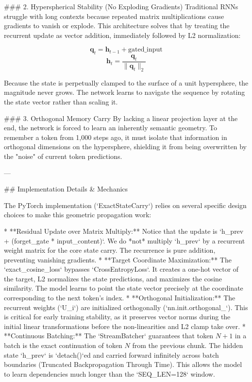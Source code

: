 ### 2. Hyperspherical Stability (No Exploding Gradients)
Traditional RNNs struggle with long contexts because repeated matrix multiplications cause gradients to vanish or explode. This architecture solves that by treating the recurrent update as vector addition, immediately followed by L2 normalization:

$$ \mathbf{q}_t = \mathbf{h}_{t-1} + \text{gated\_input} $$
$$ \mathbf{h}_t = \frac{\mathbf{q}_t}{\|\mathbf{q}_t\|_2} $$

Because the state is perpetually clamped to the surface of a unit hypersphere, the magnitude never grows. The network learns to navigate the sequence by rotating the state vector rather than scaling it.

### 3. Orthogonal Memory Carry
By lacking a linear projection layer at the end, the network is forced to learn an inherently semantic geometry. To remember a token from 1,000 steps ago, it must isolate that information in orthogonal dimensions on the hypersphere, shielding it from being overwritten by the "noise" of current token predictions.

---

## Implementation Details & Mechanics

The PyTorch implementation (`ExactStateCarry`) relies on several specific design choices to make this geometric propagation work:

*   **Residual Update over Matrix Multiply:** Notice that the update is `h_prev + (forget_gate * input_content)`. We do *not* multiply `h_prev` by a recurrent weight matrix for the core state carry. The recurrence is pure addition, preventing vanishing gradients.
*   **Target Coordinate Maximization:** The `exact_cosine_loss` bypasses `CrossEntropyLoss`. It creates a one-hot vector of the target, L2 normalizes the state predictions, and maximizes the cosine similarity. The model learns to point the state vector precisely at the coordinate corresponding to the next token's index.
*   **Orthogonal Initialization:** The recurrent weights (`U_i`) are initialized orthogonally (`nn.init.orthogonal_`). This is critical for early training stability, as it preserves vector norms during the initial linear transformations before the non-linearities and L2 clamp take over.
*   **Continuous Batching:** The `StreamBatcher` guarantees that token $N+1$ in a batch is the exact continuation of token $N$ from the previous chunk. The hidden state `h_prev` is `detach()`ed and carried forward infinitely across batch boundaries (Truncated Backpropagation Through Time). This allows the model to learn dependencies much longer than the `SEQ_LEN=128` window.

